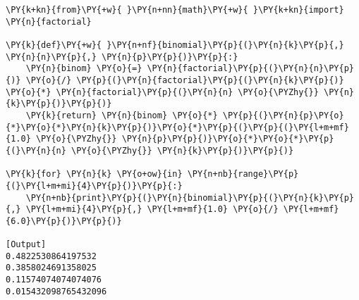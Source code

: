 \begin{Verbatim}[label=\makebox{\href{https://github.com/unipi-physics-labs/statnotes/tree/main/snippy/binomial.py}{https://github.com/.../binomial.py}},commandchars=\\\{\}]
\PY{k+kn}{from}\PY{+w}{ }\PY{n+nn}{math}\PY{+w}{ }\PY{k+kn}{import} \PY{n}{factorial}

\PY{k}{def}\PY{+w}{ }\PY{n+nf}{binomial}\PY{p}{(}\PY{n}{k}\PY{p}{,} \PY{n}{n}\PY{p}{,} \PY{n}{p}\PY{p}{)}\PY{p}{:}
    \PY{n}{binom} \PY{o}{=} \PY{n}{factorial}\PY{p}{(}\PY{n}{n}\PY{p}{)} \PY{o}{/} \PY{p}{(}\PY{n}{factorial}\PY{p}{(}\PY{n}{k}\PY{p}{)} \PY{o}{*} \PY{n}{factorial}\PY{p}{(}\PY{n}{n} \PY{o}{\PYZhy{}} \PY{n}{k}\PY{p}{)}\PY{p}{)}
    \PY{k}{return} \PY{n}{binom} \PY{o}{*} \PY{p}{(}\PY{n}{p}\PY{o}{*}\PY{o}{*}\PY{n}{k}\PY{p}{)}\PY{o}{*}\PY{p}{(}\PY{p}{(}\PY{l+m+mf}{1.0} \PY{o}{\PYZhy{}} \PY{n}{p}\PY{p}{)}\PY{o}{*}\PY{o}{*}\PY{p}{(}\PY{n}{n} \PY{o}{\PYZhy{}} \PY{n}{k}\PY{p}{)}\PY{p}{)}

\PY{k}{for} \PY{n}{k} \PY{o+ow}{in} \PY{n+nb}{range}\PY{p}{(}\PY{l+m+mi}{4}\PY{p}{)}\PY{p}{:}
    \PY{n+nb}{print}\PY{p}{(}\PY{n}{binomial}\PY{p}{(}\PY{n}{k}\PY{p}{,} \PY{l+m+mi}{4}\PY{p}{,} \PY{l+m+mf}{1.0} \PY{o}{/} \PY{l+m+mf}{6.0}\PY{p}{)}\PY{p}{)}

[Output]
0.4822530864197532
0.3858024691358025
0.11574074074074076
0.015432098765432096
\end{Verbatim}
